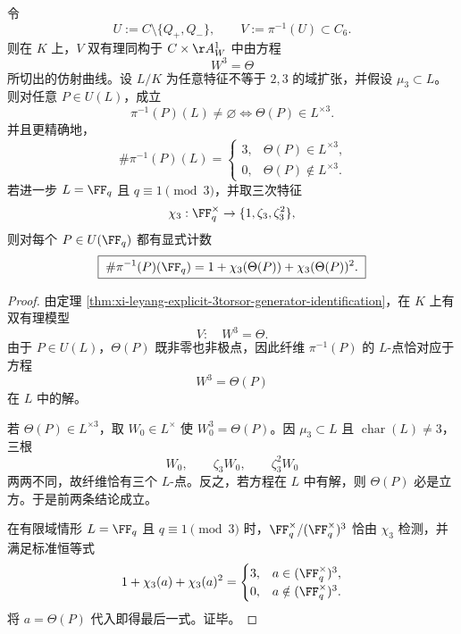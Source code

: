 \begin{theorem}\label{thm:xi-leyang-kummer-fiber-cubic-residue-criterion}
令
\[
U:=C\setminus\{Q_+,Q_-\},
\qquad
V:=\pi^{-1}(U)\subset C_6.
\]
则在 \(K\) 上，\(V\) 双有理同构于 \(C\times\AA^1_W\) 中由方程
\[
W^3=\Theta
\]
所切出的仿射曲线。设 \(L/K\) 为任意特征不等于 \(2,3\) 的域扩张，并假设 \(\mu_3\subset L\)。则对任意 \(P\in U(L)\)，成立
\[
\boxed{\;
\pi^{-1}(P)(L)\neq\varnothing
\iff
\Theta(P)\in L^{\times 3}.\;}
\]
并且更精确地，
\[
\boxed{\;
\#\pi^{-1}(P)(L)=
\begin{cases}
3,& \Theta(P)\in L^{\times 3},\\
0,& \Theta(P)\notin L^{\times 3}.
\end{cases}}
\]
若进一步 \(L=\FF_q\) 且 \(q\equiv 1\pmod 3\)，并取三次特征
\[
\chi_3:\FF_q^\times\to\{1,\zeta_3,\zeta_3^2\},
\]
则对每个 \(P\in U(\FF_q)\) 都有显式计数
\[
\boxed{\;
\#\pi^{-1}(P)(\FF_q)
=
1+\chi_3(\Theta(P))+\chi_3(\Theta(P))^2.\;}
\]
\end{theorem}
\begin{proof}
由定理 \ref{thm:xi-leyang-explicit-3torsor-generator-identification}，在 \(K\) 上有双有理模型
\[
V:\quad W^3=\Theta.
\]
由于 \(P\in U(L)\)，\(\Theta(P)\) 既非零也非极点，因此纤维 \(\pi^{-1}(P)\) 的 \(L\)-点恰对应于方程
\[
W^3=\Theta(P)
\]
在 \(L\) 中的解。

若 \(\Theta(P)\in L^{\times 3}\)，取 \(W_0\in L^\times\) 使 \(W_0^3=\Theta(P)\)。因 \(\mu_3\subset L\) 且 \(\operatorname{char}(L)\neq 3\)，三根
\[
W_0,\qquad \zeta_3W_0,\qquad \zeta_3^2W_0
\]
两两不同，故纤维恰有三个 \(L\)-点。反之，若方程在 \(L\) 中有解，则 \(\Theta(P)\) 必是立方。于是前两条结论成立。

在有限域情形 \(L=\FF_q\) 且 \(q\equiv 1\pmod 3\) 时，\(\FF_q^\times/(\FF_q^\times)^3\) 恰由 \(\chi_3\) 检测，并满足标准恒等式
\[
1+\chi_3(a)+\chi_3(a)^2=
\begin{cases}
3,& a\in (\FF_q^\times)^3,\\
0,& a\notin (\FF_q^\times)^3.
\end{cases}
\]
将 \(a=\Theta(P)\) 代入即得最后一式。证毕。
\end{proof}

